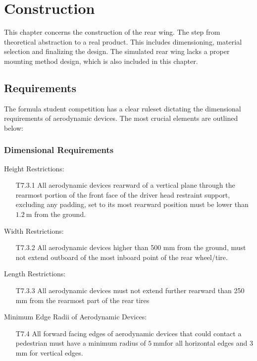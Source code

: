 \chapter{Construction}

  This chapter concerns the construction of the rear wing. The step from theoretical abstraction to a real product. This includes dimensioning, material selection and finalizing the design. The simulated rear wing lacks a proper mounting method design, which is also included in this chapter.

\section{Requirements}

  The formula student competition has a clear ruleset dictating the dimensional requirements of aerodynamic devices. The most crucial elements are outlined below:

  \subsection{Dimensional Requirements}
    \begin{tcolorbox}
      Height Restrictions:
      \begin{itemize}
        \item[T7.3.1] All aerodynamic devices rearward of a vertical plane through the rearmost portion of the front face of the driver head restraint support, excluding any padding, set to its most rearward position must be lower than $\SI{1.2}{\metre}$ from the ground.
      \end{itemize}

      Width Restrictions:
      \begin{itemize}
       \item [T7.3.2] All aerodynamic devices higher than 500 mm from the ground, must not extend outboard of the most inboard point of the rear wheel/tire.
      \end{itemize}

      Length Restrictions:
      \begin{itemize}
        \item [T7.3.3] All aerodynamic devices must not extend further rearward than 250 mm from the rearmost part of the rear tires
      \end{itemize}

      Minimum Edge Radii of Aerodynamic Devices:
      \begin{itemize}
        \item[T7.4] All forward facing edges of aerodynamic devices that could contact a pedestrian must have a
      minimum radius of $\SI{5}{\milli\metre}$for all horizontal edges and 3 mm for vertical edges.
      \end{itemize}
    \end{tcolorbox}

